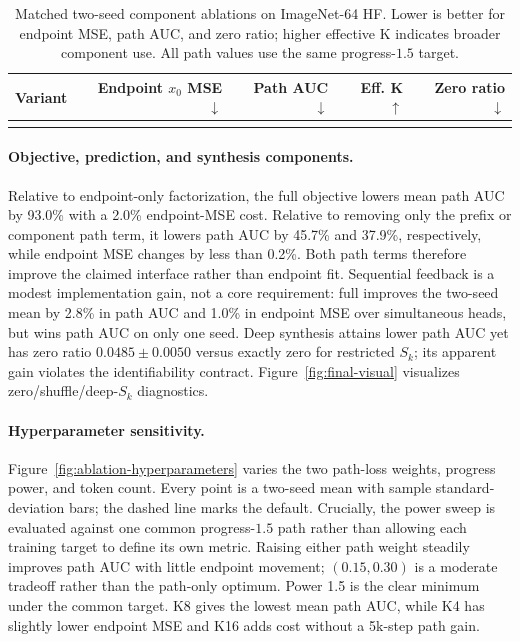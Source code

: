 \documentclass[letterpaper]{article}
\begin{document}
\begin{table}[t]
  \centering
  \small
  \caption{Matched two-seed component ablations on ImageNet-64 HF. Lower is
  better for endpoint MSE, path AUC, and zero ratio; higher effective K indicates
  broader component use. All path values use the same progress-$1.5$ target.}
  \label{tab:component-ablation}
  \begin{tabular}{lrrrr}
    \toprule
    Variant & Endpoint $x_0$ MSE $\downarrow$ & Path AUC $\downarrow$ & Eff. K $\uparrow$ & Zero ratio $\downarrow$ \\
    \midrule
    \\
    \bottomrule
  \end{tabular}
\end{table}

\paragraph{Objective, prediction, and synthesis components.}
Relative to endpoint-only factorization, the full objective lowers mean path AUC
by 93.0\% with a 2.0\% endpoint-MSE cost. Relative to removing only the prefix
or component path term, it lowers path AUC by 45.7\% and 37.9\%, respectively,
while endpoint MSE changes by less than 0.2\%. Both path terms therefore improve
the claimed interface rather than endpoint fit. Sequential feedback is a modest
implementation gain, not a core requirement: full improves the two-seed mean by
2.8\% in path AUC and 1.0\% in endpoint MSE over simultaneous heads, but wins
path AUC on only one seed. Deep synthesis attains lower path AUC yet has zero
ratio $0.0485\pm0.0050$ versus exactly zero for restricted $S_k$; its apparent
gain violates the identifiability contract. Figure~\ref{fig:final-visual}
visualizes zero/shuffle/deep-$S_k$ diagnostics.

\paragraph{Hyperparameter sensitivity.}
Figure~\ref{fig:ablation-hyperparameters} varies the two path-loss weights,
progress power, and token count. Every point is a two-seed mean with sample
standard-deviation bars; the dashed line marks the default. Crucially, the power
sweep is evaluated against one common progress-$1.5$ path rather than allowing
each training target to define its own metric. Raising either path weight
steadily improves path AUC with little endpoint movement; $(0.15,0.30)$ is a
moderate tradeoff rather than the path-only optimum. Power 1.5 is the clear
minimum under the common target. K8 gives the lowest mean path AUC, while K4 has
slightly lower endpoint MSE and K16 adds cost without a 5k-step path gain.
\end{document}

